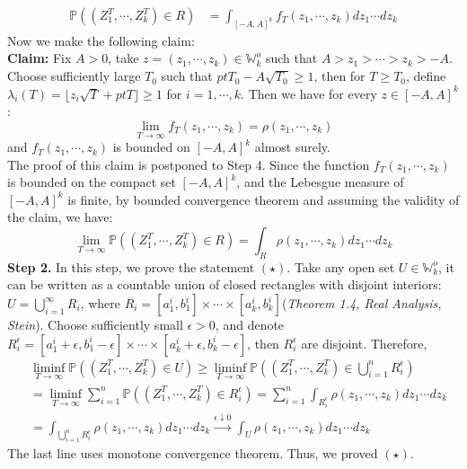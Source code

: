 \documentclass[12pt]{article}
\begin{document}
\begin{align*}
\mathbb{P}((Z_{1}^{T},\cdots,Z_{k}^{T})\in R)&=\int_{[-A,A]^{k}}f_{T}(z_{1},\cdots,z_{k})dz_{1}\cdots dz_{k}
\end{align*}
Now we make the following claim:\\
\textbf{Claim: }Fix $A>0$, take $z=(z_{1},\cdots,z_{k})\in\mathbb{W}_{k}^{o}$ such that $A>z_{1}>\cdots>z_{k}>-A$. Choose sufficiently large $T_{0}$ such that $ptT_{0}-A\sqrt{T_{0}}\geqslant 1$, then for $T\geqslant T_{0}$, define $\lambda_{i}(T)=\lfloor z_{i}\sqrt{T}+ptT\rfloor\geqslant 1$ for $i=1,\cdots,k$. Then we have for every $z\in[-A,A]^{k}$:
$$\lim_{T\rightarrow\infty}f_{T}(z_{1},\cdots,z_{k})=\rho(z_{1},\cdots,z_{k})$$ and $f_{T}(z_{1},\cdots,z_{k})$ is bounded on $[-A,A]^{k}$ almost surely.\\
The proof of this claim is postponed to Step 4. Since the function $f_{T}(z_{1},\cdots,z_{k})$ is bounded on the compact set $[-A,A]^{k}$, and the Lebesgue measure of $[-A,A]^{k}$ is finite, by bounded convergence theorem and assuming the validity of the claim, we have:
$$\lim_{T\rightarrow\infty}\mathbb{P}((Z_{1}^{T},\cdots,Z_{k}^{T})\in R)=\int_{R}\rho(z_{1},\cdots,z_{k})dz_{1}\cdots dz_{k}$$
\textbf{Step 2. }In this step, we prove the statement $(\star)$. Take any open set $U\in \mathbb{W}_{k}^{o}$, it can be written as a countable union of closed rectangles with disjoint interiors: $U=\bigcup_{i=1}^{\infty}R_{i}$, where $R_{i}=[a_{1}^{i},b_{1}^{i}]\times\cdots\times[a_{k}^{i},b_{k}^{i}]$(\emph{Theorem 1.4, Real Analysis, Stein}). Choose sufficiently small $\epsilon>0$, and denote $R_{i}^{\epsilon}=[a_{1}^{i}+\epsilon,b_{1}^{i}-\epsilon]\times\cdots\times[a_{k}^{i}+\epsilon,b_{k}^{i}-\epsilon]$, then $R_{i}^{\epsilon}$ are disjoint. Therefore,
\begin{align*}
	&\liminf_{T\rightarrow\infty}\mathbb{P}((Z_{1}^{T},\cdots,Z_{k}^{T})\in U)\geqslant\liminf_{T\rightarrow\infty}\mathbb{P}((Z_{1}^{T},\cdots,Z_{k}^{T})\in \bigcup_{i=1}^{n}R_{i}^{\epsilon})\\
	&=\liminf_{T\rightarrow\infty}\sum_{i=1}^{n}\mathbb{P}((Z_{1}^{T},\cdots,Z_{k}^{T})\in R_{i}^{\epsilon})=\sum_{i=1}^{n}\int_{R_{i}^{\epsilon}}\rho(z_1,\cdots,z_{k})dz_{1}\cdots dz_{k}\\
	&=\int_{\bigcup_{i=1}^{n}R_{i}^{\epsilon}}\rho(z_1,\cdots,z_{k})dz_{1}\cdots dz_{k} \xrightarrow{\epsilon\downarrow 0} \int_{U}\rho(z_1,\cdots,z_{k})dz_{1}\cdots dz_{k}
\end{align*}
The last line uses monotone convergence theorem. Thus, we proved $(\star)$.\\
\end{document}
